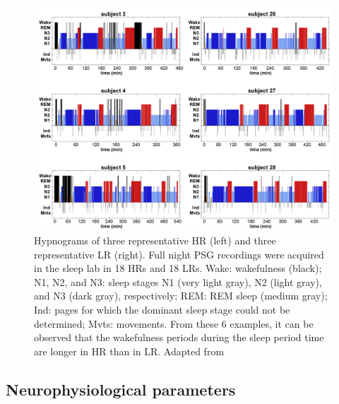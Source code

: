 \begin{figure}[htb]
	\includegraphics[width=\textwidth]{Fig/Intro/Intro_JBE_sleep/Intro_JBE_sleep.png}
	\caption[Hypnograms of typical high and low dream recallers]{Hypnograms of three representative HR (left) and three representative LR (right). Full night PSG recordings were acquired in the sleep lab in 18 HRs and 18 LRs. Wake: wakefulness (black); N1, N2, and N3: sleep stages N1 (very light gray), N2 (light gray), and N3 (dark gray), respectively; REM: REM sleep (medium gray); Ind: pages for which the dominant sleep stage could not be determined; Mvts: movements. From these 6 examples, it can be observed that the wakefulness periods during the sleep period time are longer in HR than in LR. Adapted from \citet{eichenlaub_brain_2014}}
	\label{fig:intro:jbe-sleep}
\end{figure}

\subsection{Neurophysiological parameters}
\label{sec:dream-recall:param:neuro}

